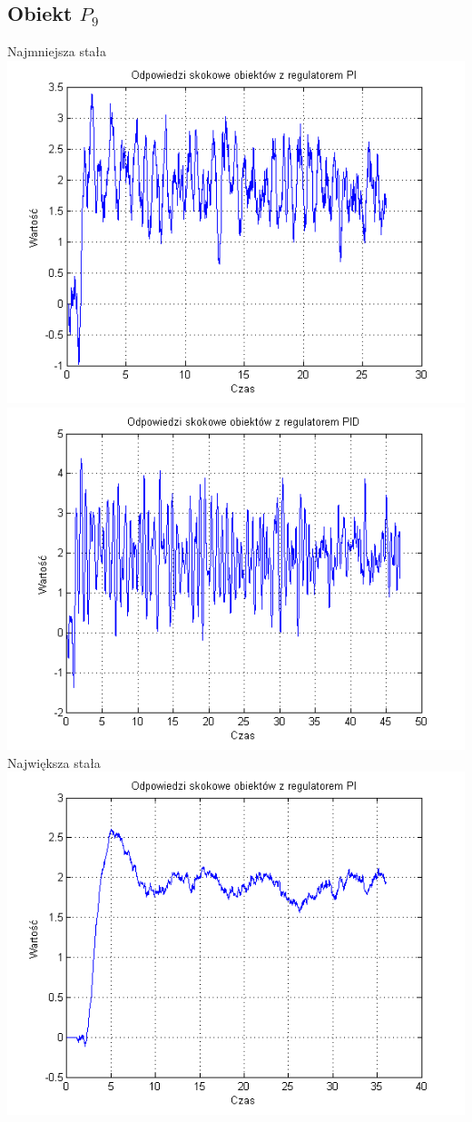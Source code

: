 \documentclass[10pt,a4paper]{article}
\begin{document}
\subsection*{Obiekt $P_9$}
Najmniejsza stała\\
\includegraphics[scale=1]{images/trzy/skrypt_19.png}\\
\includegraphics[scale=1]{images/cztery/skrypt_19.png}\\
Największa stała\\
\includegraphics[scale=1]{images/trzy/skrypt_20.png}\\
\end{document}
